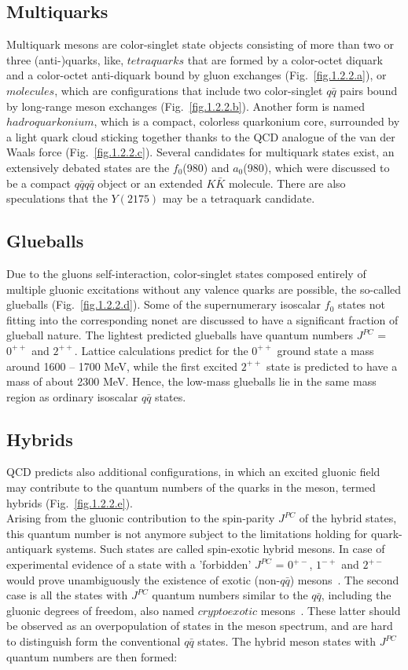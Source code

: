 \subsection{Multiquarks}
Multiquark mesons are color-singlet state objects consisting of more than two or three (anti-)quarks, like, $tetraquarks$ that are formed by a color-octet diquark and a color-octet anti-diquark bound by gluon exchanges (Fig.~\ref{fig.1.2.2.a}), or $molecules$, which are configurations that include two color-singlet $q\bar{q}$ pairs bound by long-range meson exchanges (Fig.~\ref{fig.1.2.2.b}). Another form is named $hadroquarkonium$, which is a compact, colorless quarkonium core, surrounded by a light quark cloud sticking together thanks to the QCD analogue of the van der Waals force (Fig.~\ref{fig.1.2.2.c}). Several candidates for multiquark states exist, an extensively debated states are the $f_0$(980) and $a_0$(980), which were discussed to be a compact $q\bar{q}$$q\bar{q}$ object or an extended $K\bar{K}$ molecule. There are also speculations that the $Y(2175)$ may be a tetraquark candidate.

\subsection{Glueballs}
Due to the gluons self-interaction, color-singlet states composed entirely of multiple gluonic excitations without any valence quarks are possible, the so-called glueballs (Fig.~\ref{fig.1.2.2.d}). Some of the supernumerary isoscalar $f_0$ states not fitting into the corresponding nonet are discussed to have a significant fraction of glueball nature. The lightest predicted glueballs have quantum numbers $J^{PC}$ = $0^{++}$ and $2^{++}$. Lattice calculations predict for the $0^{++}$ ground state a mass around 1600 – 1700 MeV, while the first excited $2^{++}$ state is predicted to have a mass of about 2300 MeV. Hence, the low-mass glueballs lie in the same mass region as ordinary isoscalar $q\bar{q}$ states.

\subsection{Hybrids}
QCD predicts also additional configurations, in which an excited gluonic field may contribute to the quantum numbers of the quarks in the meson, termed hybrids (Fig.~\ref{fig.1.2.2.e}).\\
Arising from the gluonic contribution to the spin-parity $J^{PC}$ of the hybrid states, this quantum number is not anymore subject to the limitations holding for quark-antiquark systems. Such states are called spin-exotic hybrid mesons. In case of experimental evidence of a state with a 'forbidden' $J^{PC}$ = $0^{+-}$, $1^{-+}$ and $2^{+-}$ would prove unambiguously the existence of exotic (non-$q\bar{q}$) mesons~\cite{Isgur85}. The second case is all the states with $J^{PC}$ quantum numbers similar to the $q\bar{q}$, including the gluonic degrees of freedom, also named $cryptoexotic$ mesons~\cite{Meyer18}. These latter should be observed as an overpopulation of states in the meson spectrum, and are hard to distinguish form the conventional $q\bar{q}$ states. The hybrid meson states with $J^{PC}$ quantum numbers are then formed:

